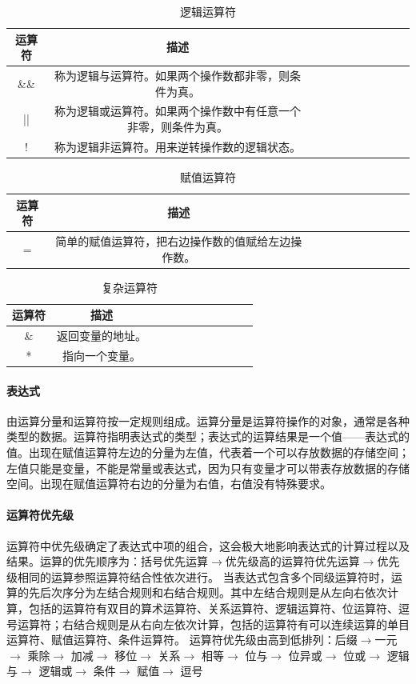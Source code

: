 \documentclass[UTF8,a4paper,10pt]{ctexart}
\begin{document}
\begin{table}[!htbp]
  \centering
  \begin{tabular}{ccccccccccc}
  \toprule  
  运算符& 描述&\\
  \midrule
  \&\& &  称为逻辑与运算符。如果两个操作数都非零，则条件为真。&\\
  ||&  称为逻辑或运算符。如果两个操作数中有任意一个非零，则条件为真。&\\
  !& 称为逻辑非运算符。用来逆转操作数的逻辑状态。&\\
  \bottomrule
  \end{tabular}
  \caption{逻辑运算符}
\end{table}
\begin{table}[!htbp]
  \centering
  \begin{tabular}{ccccccccccc}
  \toprule  
  运算符& 描述&\\
  \midrule
  =& 简单的赋值运算符，把右边操作数的值赋给左边操作数。&\\
  \bottomrule
  \end{tabular}
  \caption{赋值运算符}
\end{table}
\begin{table}[!htbp]
  \centering
  \begin{tabular}{ccccccccccc}
  \toprule  
  运算符& 描述&\\
  \midrule
  \& & 返回变量的地址。&\\
  * & 指向一个变量。&\\
  \bottomrule
  \end{tabular}
  \caption{复杂运算符}
\end{table}
\paragraph{表达式}由运算分量和运算符按一定规则组成。运算分量是运算符操作的对象，通常是各种类型的数据。运算符指明表达式的类型；表达式的运算结果是一个值——表达式的值。出现在赋值运算符左边的分量为左值，代表着一个可以存放数据的存储空间；左值只能是变量，不能是常量或表达式，因为只有变量才可以带表存放数据的存储空间。出现在赋值运算符右边的分量为右值，右值没有特殊要求。
\paragraph{运算符优先级}运算符中优先级确定了表达式中项的组合，这会极大地影响表达式的计算过程以及结果。运算的优先顺序为：括号优先运算$\rightarrow$优先级高的运算符优先运算$\rightarrow$优先级相同的运算参照运算符结合性依次进行。
当表达式包含多个同级运算符时，运算的先后次序分为左结合规则和右结合规则。其中左结合规则是从左向右依次计算，包括的运算符有双目的算术运算符、关系运算符、逻辑运算符、位运算符、逗号运算符；右结合规则是从右向左依次计算，包括的运算符有可以连续运算的单目运算符、赋值运算符、条件运算符。
运算符优先级由高到低排列：后缀$\rightarrow$一元 $\rightarrow$
乘除$\rightarrow$
加减$\rightarrow$
移位$\rightarrow$ 
关系$\rightarrow$
相等$\rightarrow$
位与$\rightarrow$
位异或$\rightarrow$
位或$\rightarrow$
逻辑与$\rightarrow$
逻辑或$\rightarrow$
条件$\rightarrow$
赋值$\rightarrow$
逗号
\end{document}
